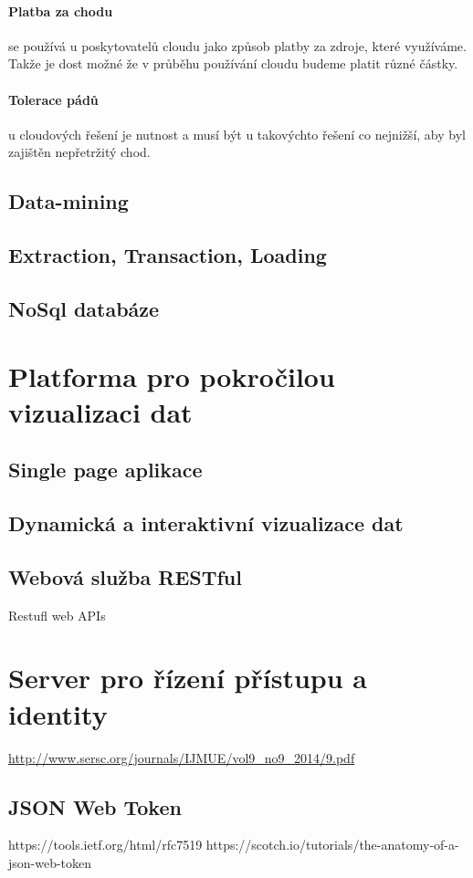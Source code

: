 \paragraph{Platba za chodu} se používá u poskytovatelů cloudu jako způsob platby za zdroje, které využíváme. Takže je dost možné že v průběhu používání cloudu budeme platit různé částky. \cite{big-data-dummies}

\paragraph{Tolerace pádů} u cloudových řešení je nutnost a musí být u takovýchto řešení co nejnižší, aby byl zajištěn nepřetržitý chod. \cite{big-data-dummies}

\subsection{Data-mining}

\subsection{Extraction, Transaction, Loading}

\subsection{NoSql databáze}
\cite{nosql}

\section{Platforma pro pokročilou vizualizaci dat}
\subsection{Single page aplikace}
\subsection{Dynamická a interaktivní vizualizace dat}
\subsection{Webová služba RESTful}
Restufl web APIs

\section{Server pro řízení přístupu a identity}
\url{http://www.sersc.org/journals/IJMUE/vol9_no9_2014/9.pdf}

\subsection{JSON Web Token}
https://tools.ietf.org/html/rfc7519
https://scotch.io/tutorials/the-anatomy-of-a-json-web-token
